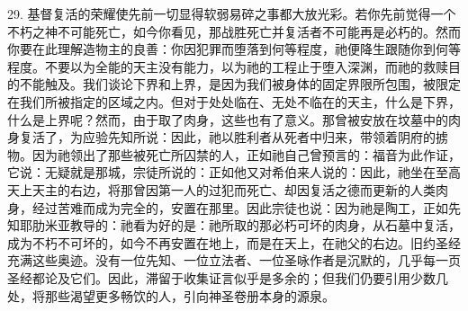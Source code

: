 29. 基督复活的荣耀使先前一切显得软弱易碎之事都大放光彩。若你先前觉得一个不朽之神不可能死亡，如今你看见，那战胜死亡并复活者不可能再是必朽的。然而你要在此理解造物主的良善：你因犯罪而堕落到何等程度，祂便降生跟随你到何等程度。不要以为全能的天主没有能力，以为祂的工程止于堕入深渊，而祂的救赎目的不能触及。我们谈论下界和上界，是因为我们被身体的固定界限所包围，被限定在我们所被指定的区域之内。但对于处处临在、无处不临在的天主，什么是下界，什么是上界呢？然而，由于取了肉身，这些也有了意义。那曾被安放在坟墓中的肉身复活了，为应验先知所说：因此，祂以胜利者从死者中归来，带领着阴府的掳物。因为祂领出了那些被死亡所囚禁的人，正如祂自己曾预言的：福音为此作证，它说：无疑就是那城，宗徒所说的：正如他又对希伯来人说的：因此，祂坐在至高天上天主的右边，将那曾因第一人的过犯而死亡、却因复活之德而更新的人类肉身，经过苦难而成为完全的，安置在那里。因此宗徒也说：因为祂是陶工，正如先知耶肋米亚教导的：祂看为好的是：祂所取的那必朽可坏的肉身，从石墓中复活，成为不朽不可坏的，如今不再安置在地上，而是在天上，在祂父的右边。旧约圣经充满这些奥迹。没有一位先知、一位立法者、一位圣咏作者是沉默的，几乎每一页圣经都论及它们。因此，滞留于收集证言似乎是多余的；但我们仍要引用少数几处，将那些渴望更多畅饮的人，引向神圣卷册本身的源泉。\par

